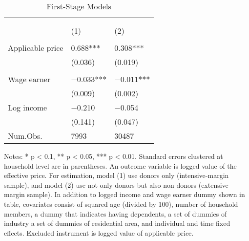 \begin{table}

\caption{First-Stage Models\label{tab:main-stage1}}
\centering
\fontsize{8}{10}\selectfont
\begin{threeparttable}
\begin{tabular}[t]{l>{\centering\arraybackslash}p{18.75em}>{\centering\arraybackslash}p{18.75em}}
\toprule
\multicolumn{1}{c}{ } & \multicolumn{2}{c}{Effective price} \\
\cmidrule(l{3pt}r{3pt}){2-3}
\multicolumn{1}{c}{ } & \multicolumn{1}{c}{Donors (Intensive-margin)} & \multicolumn{1}{c}{Donors and Non-donors (Extensive-margin)} \\
\cmidrule(l{3pt}r{3pt}){2-2} \cmidrule(l{3pt}r{3pt}){3-3}
  & (1) & (2)\\
\midrule
\addlinespace[0.3em]
\multicolumn{3}{l}{\textit{Excluded instruments}}\\
\hspace{1em}Applicable price & \num{0.688}*** & \num{0.308}***\\
\hspace{1em} & (\num{0.036}) & (\num{0.019})\\
\addlinespace[0.3em]
\multicolumn{3}{l}{\textit{Covariates}}\\
\hspace{1em}Wage earner & \num{-0.033}*** & \num{-0.011}***\\
\hspace{1em} & (\num{0.009}) & (\num{0.002})\\
\hspace{1em}Log income & \num{-0.210} & \num{-0.054}\\
\hspace{1em} & (\num{0.141}) & (\num{0.047})\\
\midrule
Num.Obs. & \num{7993} & \num{30487}\\
\bottomrule
\end{tabular}
\begin{tablenotes}
\item Notes: * p < 0.1, ** p < 0.05, *** p < 0.01. Standard errors clustered at household level are in parentheses. An outcome variable is logged value of the effective price. For estimation, model (1) use donors only (intensive-margin sample), and model (2) use not only donors but also non-donors (extensive-margin sample). In addition to logged income and wage earner dummy shown in table, covariates consist of squared age (divided by 100), number of household members, a dummy that indicates having dependents, a set of dummies of industry a set of dummies of residential area, and individual and time fixed effects. Excluded instrument is logged value of applicable price.
\end{tablenotes}
\end{threeparttable}
\end{table}

